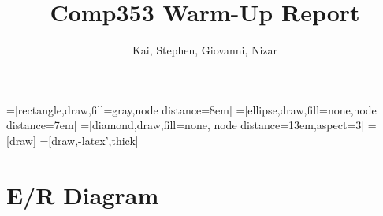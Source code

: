 \documentclass[12pt]{article}
\title{Comp353 Warm-Up Report}
\author{Kai, Stephen, Giovanni, Nizar}
\begin{document}
	\maketitle
	 =[rectangle,draw,fill=gray,node distance=8em]
    =[ellipse,draw,fill=none,node distance=7em]
    =[diamond,draw,fill=none, node distance=13em,aspect=3]
    =[draw]
    =[draw,-latex',thick]

	
	\section{E/R Diagram}
	\begin{tikzpicture}
	\end{tikzpicture}
\end{document}
